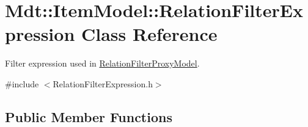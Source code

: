 \hypertarget{class_mdt_1_1_item_model_1_1_relation_filter_expression}{}\section{Mdt\+:\+:Item\+Model\+:\+:Relation\+Filter\+Expression Class Reference}
\label{class_mdt_1_1_item_model_1_1_relation_filter_expression}


Filter expression used in \hyperlink{class_mdt_1_1_item_model_1_1_relation_filter_proxy_model}{Relation\+Filter\+Proxy\+Model}.  




{\ttfamily \#include $<$Relation\+Filter\+Expression.\+h$>$}

\subsection*{Public Member Functions}
